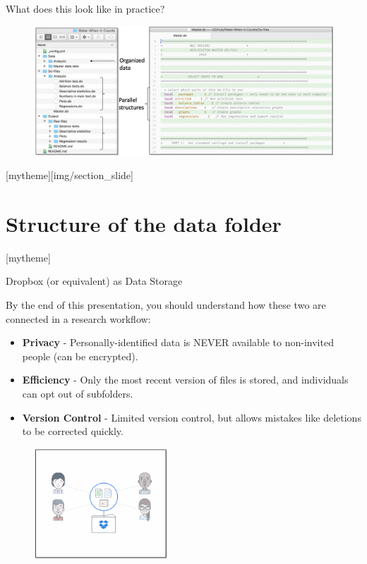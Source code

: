 \documentclass[aspectratio=169]{beamer}
\newcommand{\sectionpic}[2]{
	\setbeamertemplate{section page}[mytheme][#2]
	\section{#1}
	\setbeamertemplate{section page}[mytheme]
}
\begin{document}
\begin{frame}{What does this look like in practice?}

	\begin{figure}
		\centering
		\includegraphics[width=\linewidth]{img/Organize2}
	\end{figure}

\end{frame}

\sectionpic{Structure of the data folder}{img/section_slide}

\begin{frame}[fragile]{Dropbox (or equivalent) as Data Storage}
\begin{multicols}{2}	
	
	By the end of this presentation, you should understand how these two are connected in a research workflow:
	
	\begin{itemize}[<default overlay specification>]
		\item<1> \textbf{Privacy} - Personally-identified data is NEVER available to non-invited people (can be encrypted).
		\item<1> \textbf{Efficiency} - Only the most recent version of files is stored, and individuals can opt out of subfolders.
		\item<1> \textbf{Version Control } - Limited version control, but allows mistakes like deletions to be corrected quickly.
	\end{itemize}
	
	\begin{figure}
		\centering
		\includegraphics[width=50mm]{img/Structure}
	\end{figure}
	
\end{multicols}
\end{frame}
\end{document}
